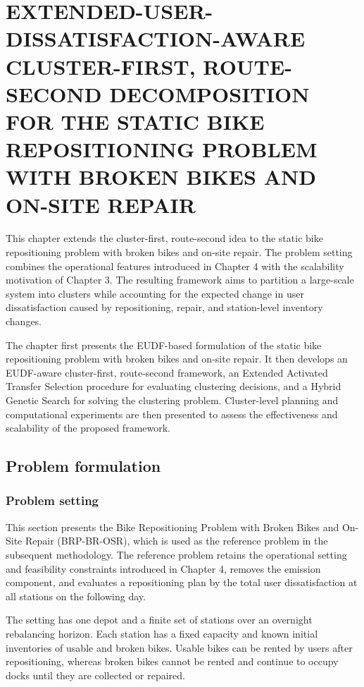 \chapter[EUDF-AWARE BRP WITH REPAIR]{EXTENDED-USER-DISSATISFACTION-AWARE CLUSTER-FIRST, ROUTE-SECOND DECOMPOSITION FOR THE STATIC BIKE REPOSITIONING PROBLEM WITH BROKEN BIKES AND ON-SITE REPAIR}

This chapter extends the cluster-first, route-second idea to the static bike repositioning problem with broken bikes and on-site repair. The problem setting combines the operational features introduced in Chapter 4 with the scalability motivation of Chapter 3. The resulting framework aims to partition a large-scale system into clusters while accounting for the expected change in user dissatisfaction caused by repositioning, repair, and station-level inventory changes.

The chapter first presents the EUDF-based formulation of the static bike repositioning problem with broken bikes and on-site repair. It then develops an EUDF-aware cluster-first, route-second framework, an Extended Activated Transfer Selection procedure for evaluating clustering decisions, and a Hybrid Genetic Search for solving the clustering problem. Cluster-level planning and computational experiments are then presented to assess the effectiveness and scalability of the proposed framework.

\section{Problem formulation}\label{ch5:sec:problem-formulation}\label{ch5:sec:problem}

\subsection{Problem setting}

This section presents the Bike Repositioning Problem with Broken Bikes and
On-Site Repair (BRP-BR-OSR), which is used as the reference problem in the
subsequent methodology. The reference problem retains the operational setting
and feasibility constraints introduced in Chapter 4, removes the emission
component, and evaluates a repositioning plan by the total user dissatisfaction
at all stations on the following day.

The setting has one depot and a finite set of stations over an overnight
rebalancing horizon. Each station has a fixed capacity and known
initial inventories of usable and broken bikes. Usable bikes can be rented by
users after repositioning, whereas broken bikes cannot be rented and continue to
occupy docks until they are collected or repaired.

